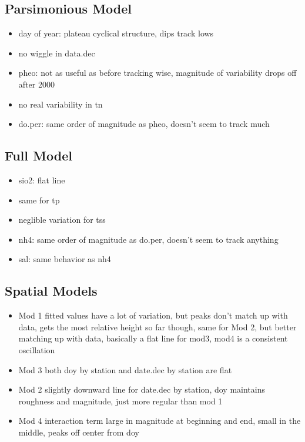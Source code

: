 \documentclass[12pt]{amsart}
\begin{document}
\subsection{Parsimonious Model}
\begin{itemize}
\item day of year: plateau cyclical structure, dips track lows
\item no wiggle in data.dec
\item pheo: not as useful as before tracking wise, magnitude of variability drops off after 2000
\item no real variability in tn
\item do.per: same order of magnitude as pheo, doesn't seem to track much
\end{itemize}
\subsection{Full Model}
\begin{itemize}
\item sio2: flat line
\item same for tp
\item neglible variation for tss
\item nh4: same order of magnitude as do.per, doesn't seem to track anything
\item sal: same behavior as nh4
\end{itemize}

\subsection{Spatial Models}

\begin{itemize}
\item Mod 1 fitted values have a lot of variation, but peaks don't match up with data, gets the most relative height so far though, same for Mod 2, but better matching up with data, basically a flat line for mod3, mod4 is a consistent oscillation
\item Mod 3 both doy by station and date.dec by station are flat
\item Mod 2 slightly downward line for date.dec by station, doy maintains roughness and magnitude, just more regular than mod 1
\item Mod 4 interaction term large in magnitude at beginning and end, small in the middle, peaks off center from doy
\end{itemize}
\end{document}
